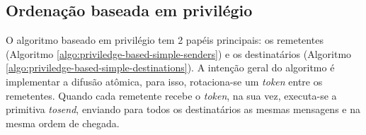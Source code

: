 

\subsection{Ordenação baseada em privilégio}

O algoritmo baseado em privilégio tem 2 papéis principais: os remetentes (Algoritmo \ref{algo:priviledge-based-simple-senders}) e os destinatários (Algoritmo \ref{algo:priviledge-based-simple-destinations}). A intenção geral do algoritmo é implementar a difusão atômica, para isso, rotaciona-se um \textit{token} entre os remetentes. Quando cada remetente recebe o \textit{token}, na sua vez, executa-se a primitiva \textit{tosend}, enviando para todos os destinatários as mesmas mensagens e na mesma ordem de chegada.

